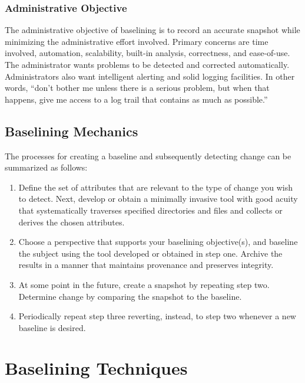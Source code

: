 \documentclass[10pt]{article}
\begin{document}
\subsubsection{Administrative Objective}

The administrative objective of baselining is to record an accurate
snapshot while minimizing the administrative effort involved.  Primary
concerns are time involved, automation, scalability, built-in
analysis, correctness, and ease-of-use.  The administrator wants
problems to be detected and corrected automatically.  Administrators
also want intelligent alerting and solid logging facilities.  In other
words, ``don't bother me unless there is a serious problem, but when
that happens, give me access to a log trail that contains as much as
possible.''

\subsection{Baselining Mechanics}

The processes for creating a baseline and subsequently detecting
change can be summarized as follows:

\begin{enumerate}

  \item
  Define the set of attributes that are relevant to the type of change
  you wish to detect.  Next, develop or obtain a minimally invasive
  tool with good acuity that systematically traverses specified
  directories and files and collects or derives the chosen attributes.

  \item
  Choose a perspective that supports your baselining objective(s), and
  baseline the subject using the tool developed or obtained in step
  one.  Archive the results in a manner that maintains provenance and
  preserves integrity.

  \item
  At some point in the future, create a snapshot by repeating step
  two. Determine change by comparing the snapshot to the baseline.

  \item
  Periodically repeat step three reverting, instead, to step two
  whenever a new baseline is desired.

\end{enumerate}

\section{Baselining Techniques}
\end{document}
